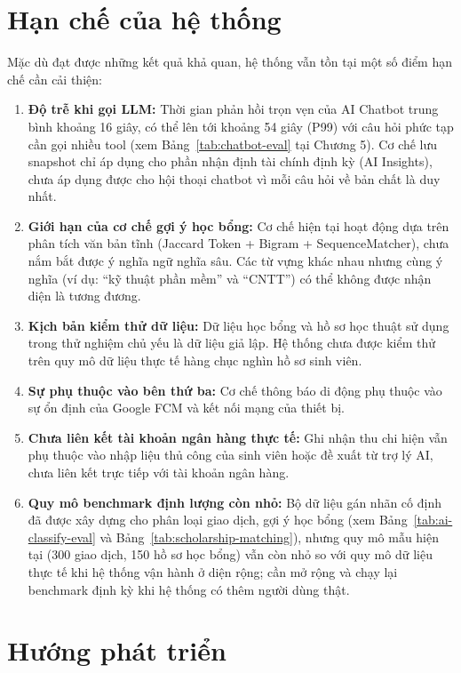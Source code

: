 \section{Hạn chế của hệ thống}
Mặc dù đạt được những kết quả khả quan, hệ thống vẫn tồn tại một số điểm hạn chế cần cải thiện:
\begin{enumerate}
    \item \textbf{Độ trễ khi gọi LLM:} Thời gian phản hồi trọn vẹn của AI Chatbot trung bình khoảng 16 giây, có thể lên tới khoảng 54 giây (P99) với câu hỏi phức tạp cần gọi nhiều tool (xem Bảng~\ref{tab:chatbot-eval} tại Chương 5). Cơ chế lưu snapshot chỉ áp dụng cho phần nhận định tài chính định kỳ (AI Insights), chưa áp dụng được cho hội thoại chatbot vì mỗi câu hỏi về bản chất là duy nhất.
    \item \textbf{Giới hạn của cơ chế gợi ý học bổng:} Cơ chế hiện tại hoạt động dựa trên phân tích văn bản tĩnh (Jaccard Token + Bigram + SequenceMatcher), chưa nắm bắt được ý nghĩa ngữ nghĩa sâu. Các từ vựng khác nhau nhưng cùng ý nghĩa (ví dụ: ``kỹ thuật phần mềm'' và ``CNTT'') có thể không được nhận diện là tương đương.
    \item \textbf{Kịch bản kiểm thử dữ liệu:} Dữ liệu học bổng và hồ sơ học thuật sử dụng trong thử nghiệm chủ yếu là dữ liệu giả lập. Hệ thống chưa được kiểm thử trên quy mô dữ liệu thực tế hàng chục nghìn hồ sơ sinh viên.
    \item \textbf{Sự phụ thuộc vào bên thứ ba:} Cơ chế thông báo di động phụ thuộc vào sự ổn định của Google FCM và kết nối mạng của thiết bị.
    \item \textbf{Chưa liên kết tài khoản ngân hàng thực tế:} Ghi nhận thu chi hiện vẫn phụ thuộc vào nhập liệu thủ công của sinh viên hoặc đề xuất từ trợ lý AI, chưa liên kết trực tiếp với tài khoản ngân hàng.
    \item \textbf{Quy mô benchmark định lượng còn nhỏ:} Bộ dữ liệu gán nhãn cố định đã được xây dựng cho phân loại giao dịch, gợi ý học bổng (xem Bảng~\ref{tab:ai-classify-eval} và Bảng~\ref{tab:scholarship-matching}), nhưng quy mô mẫu hiện tại (300 giao dịch, 150 hồ sơ học bổng) vẫn còn nhỏ so với quy mô dữ liệu thực tế khi hệ thống vận hành ở diện rộng; cần mở rộng và chạy lại benchmark định kỳ khi hệ thống có thêm người dùng thật.

\end{enumerate}

\section{Hướng phát triển}

